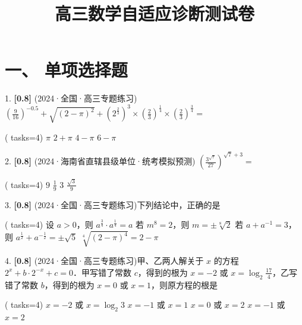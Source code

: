 \documentclass[11pt,a4paper]{article}
\title{\vspace{-2cm}\textbf{高三数学自适应诊断测试卷}}
\date{}
\begin{document}
\maketitle
\vspace{-1cm}
\section*{一、 单项选择题}
1. \textbf{[0.8]} (2024·全国·高三专题练习) $\left(\frac{9}{16}\right)^{-0.5}+\sqrt{(2-\pi)^{2}}+\left(2^{\frac{2}{3}}\right)^{3} \times\left(\frac{2}{3}\right)^{\frac{1}{4}} \times\left(\frac{2}{3}\right)^{\frac{3}{4}}=$

\begin{tasks}( tasks=4)
    \task $\pi$
    \task $2+\pi$
    \task $4-\pi$
    \task $6-\pi$
\end{tasks}

\vspace{2.5cm}

2. \textbf{[0.8]} (2024·海南省直辖县级单位·统考模拟预测) $\left(\frac{3^{\sqrt{7}}}{27}\right)^{\sqrt{7}+3}=$

\begin{tasks}( tasks=4)
    \task $9$
    \task $\frac{1}{9}$
    \task $3$
    \task $\frac{\sqrt{3}}{9}$
\end{tasks}

\vspace{2.5cm}

3. \textbf{[0.8]} (2024·全国·高三专题练习)下列结论中，正确的是

\begin{tasks}( tasks=4)
    \task 设 $a>0$，则 $a^{\frac{3}{4}} \cdot a^{\frac{1}{4}}=a$
    \task 若 $m^{8}=2$，则 $m=\pm \sqrt[8]{2}$
    \task 若 $a+a^{-1}=3$，则 $a^{\frac{1}{2}}+a^{-\frac{1}{2}}=\pm \sqrt{5}$
    \task $\sqrt[4]{(2-\pi)^{4}}=2-\pi$
\end{tasks}

\vspace{2.5cm}

4. \textbf{[0.8]} (2024·全国·高三专题练习)甲、乙两人解关于 $x$ 的方程 $2^{x}+b \cdot 2^{-x}+c=0$．甲写错了常数 $c$，得到的根为 $x=-2$ 或 $x=\log _{2} \frac{17}{4}$，乙写错了常数 $b$，得到的根为 $x=0$ 或 $x=1$，则原方程的根是

\begin{tasks}( tasks=4)
    \task $x=-2$ 或 $x=\log _{2} 3$
    \task $x=-1$ 或 $x=1$
    \task $x=0$ 或 $x=2$
    \task $x=-1$ 或 $x=2$
\end{tasks}

\vspace{2.5cm}
\end{document}
